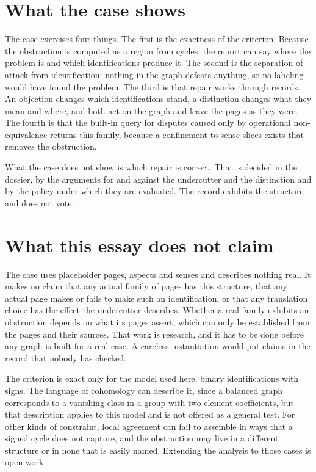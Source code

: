 \documentclass[11pt]{article}
\begin{document}
\section{What the case shows}\label{sec:shows}

The case exercises four things. The first is the exactness of the criterion. Because the obstruction is computed as a region from cycles, the report can say where the problem is and which identifications produce it. The second is the separation of attack from identification: nothing in the graph defeats anything, so no labeling would have found the problem. The third is that repair works through records. An objection changes which identifications stand, a distinction changes what they mean and where, and both act on the graph and leave the pages as they were. The fourth is that the built-in query for disputes caused only by operational non-equivalence returns this family, because a confinement to sense slices exists that removes the obstruction.

What the case does not show is which repair is correct. That is decided in the dossier, by the arguments for and against the undercutter and the distinction and by the policy under which they are evaluated. The record exhibits the structure and does not vote.

\section{What this essay does not claim}\label{sec:limits}

The case uses placeholder pages, aspects and senses and describes nothing real. It makes no claim that any actual family of pages has this structure, that any actual page makes or fails to make such an identification, or that any translation choice has the effect the undercutter describes. Whether a real family exhibits an obstruction depends on what its pages assert, which can only be established from the pages and their sources. That work is research, and it has to be done before any graph is built for a real case. A careless instantiation would put claims in the record that nobody has checked.

The criterion is exact only for the model used here, binary identifications with signs. The language of cohomology can describe it, since a balanced graph corresponds to a vanishing class in a group with two-element coefficients, but that description applies to this model and is not offered as a general test. For other kinds of constraint, local agreement can fail to assemble in ways that a signed cycle does not capture, and the obstruction may live in a different structure or in none that is easily named. Extending the analysis to those cases is open work.
\end{document}
